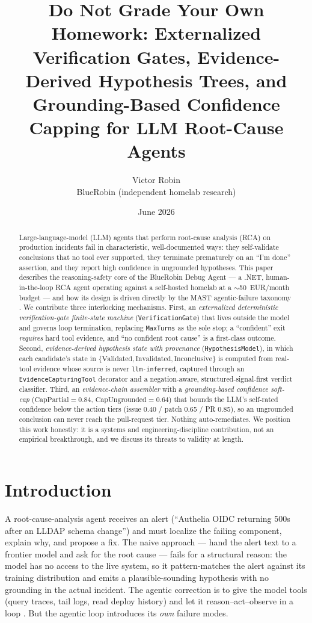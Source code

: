 \documentclass[11pt]{article}
\title{Do Not Grade Your Own Homework: Externalized Verification Gates,
Evidence-Derived Hypothesis Trees, and Grounding-Based Confidence Capping
for LLM Root-Cause Agents}
\author{Victor Robin\\ BlueRobin (independent homelab research)}
\date{June 2026}
\begin{document}
\maketitle

\begin{abstract}
Large-language-model (LLM) agents that perform root-cause analysis (RCA) on
production incidents fail in characteristic, well-documented ways: they
self-validate conclusions that no tool ever supported, they terminate
prematurely on an ``I'm done'' assertion, and they report high confidence in
ungrounded hypotheses. This paper describes the reasoning-safety core of the
BlueRobin Debug Agent --- a .NET, human-in-the-loop RCA agent operating
against a self-hosted homelab at a $\sim$50~EUR/month budget --- and how its
design is driven directly by the MAST agentic-failure taxonomy
\citep{cemri2025mast}. We contribute three interlocking mechanisms. First, an
\emph{externalized deterministic verification-gate finite-state machine}
(\texttt{VerificationGate}) that lives outside the model and governs loop
termination, replacing \texttt{MaxTurns} as the sole stop; a ``confident''
exit \emph{requires} hard tool evidence, and ``no confident root cause'' is a
first-class outcome. Second, \emph{evidence-derived hypothesis state with
provenance} (\texttt{HypothesisModel}), in which each candidate's state in
$\{\textrm{Validated}, \textrm{Invalidated}, \textrm{Inconclusive}\}$ is
computed from real-tool evidence whose source is never \texttt{llm-inferred},
captured through an \texttt{EvidenceCapturingTool} decorator and a
negation-aware, structured-signal-first verdict classifier. Third, an
\emph{evidence-chain assembler} with a \emph{grounding-based confidence
soft-cap} ($\textrm{CapPartial}=0.84$, $\textrm{CapUngrounded}=0.64$) that
bounds the LLM's self-rated confidence below the action tiers (issue 0.40 /
patch 0.65 / PR 0.85), so an ungrounded conclusion can never reach the
pull-request tier. Nothing auto-remediates. We position this work honestly:
it is a systems and engineering-discipline contribution, not an empirical
breakthrough, and we discuss its threats to validity at length.
\end{abstract}

\section{Introduction}

A root-cause-analysis agent receives an alert (``Authelia OIDC returning 500s
after an LLDAP schema change'') and must localize the failing component,
explain why, and propose a fix. The naive approach --- hand the alert text to
a frontier model and ask for the root cause --- fails for a structural reason:
the model has no access to the live system, so it pattern-matches the alert
against its training distribution and emits a plausible-sounding hypothesis
with no grounding in the actual incident. The agentic correction is to give
the model tools (query traces, tail logs, read deploy history) and let it
reason--act--observe in a loop \citep[ReAct;][]{yao2022react}. But the agentic
loop introduces its \emph{own} failure modes.
\end{document}
